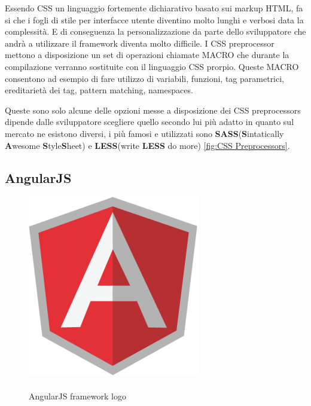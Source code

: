 Essendo CSS un linguaggio fortemente dichiarativo basato sui markup HTML, fa si che i fogli di stile per interfacce utente diventino molto lunghi e verbosi data la complessità. E di conseguenza la personalizzazione da parte dello sviluppatore che andrà a utilizzare il framework diventa molto difficile.
I CSS preprocessor mettono a disposizione un set di operazioni chiamate MACRO che durante la compilazione verranno sostituite con il linguaggio CSS prorpio. Queste MACRO consentono ad esempio di fare utilizzo di variabili, funzioni, tag parametrici, ereditarietà dei tag, pattern matching, namespaces.

Queste sono solo alcune delle opzioni messe a disposizione dei CSS preprocessors dipende dalle sviluppatore scegliere quello secondo lui più adatto in quanto sul mercato ne esistono diversi, i più famosi e utilizzati sono \textbf{SASS}(\textbf{S}intatically \textbf{A}wesome \textbf{S}tyle\textbf{S}heet) e \textbf{LESS}(write \textbf{LESS} do more) \ref{fig:CSS Preprocessors}.

\subsection{AngularJS}

\begin{figure}
  \vspace{-65pt}
  \begin{center}
    \includegraphics[scale=0.40]{Figures/angular-logo.png}
  \end{center}
  \vspace{-10pt}
  \caption{\\AngularJS framework logo}
  \label{fig:AngularJS}
  \vspace{10pt}
\end{figure}

